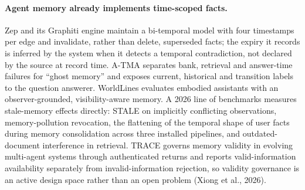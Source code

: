 \documentclass[11pt]{article}
\begin{document}
\paragraph{Agent memory already implements time-scoped facts.} Zep and its Graphiti engine maintain a bi-temporal model with four timestamps per edge and invalidate, rather than delete, superseded facts; the expiry it records is inferred by the system when it detects a temporal contradiction, not declared by the source at record time. A-TMA separates bank, retrieval and answer-time failures for ``ghost memory'' and exposes current, historical and transition labels to the question answerer. WorldLines evaluates embodied assistants with an observer-grounded, visibility-aware memory. A 2026 line of benchmarks measures stale-memory effects directly: STALE on implicitly conflicting observations, memory-pollution revocation, the flattening of the temporal shape of user facts during memory consolidation across three installed pipelines, and outdated-document interference in retrieval. TRACE governs memory validity in evolving multi-agent systems through authenticated returns and reports valid-information availability separately from invalid-information rejection, so validity governance is an active design space rather than an open problem (Xiong et al., 2026).
\end{document}
